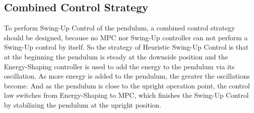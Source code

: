 \subsection{Combined Control Strategy}
To perform Swing-Up Control of the pendulum, a combined control strategy should be designed, because no MPC nor Swing-Up controller can not perform a Swing-Up control by itself. So the strategy of Heuristic Swing-Up Control is that at the beginning the pendulum is steady at the downside position and the Energy-Shaping controller is used to add the energy to the pendulum via its oscillation. As more energy is added to the pendulum, the greater the oscillations become. And as the pendulum is close to the upright operation point, the control law switches from Energy-Shaping to MPC, which finishes the Swing-Up Control by stabilizing the pendulum at the upright position.
